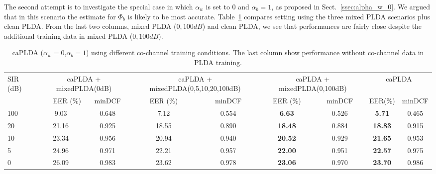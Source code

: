 The second attempt is to investigate the special case in which $\alpha_w$ is set to $0$ and $\alpha_b=1$, as proposed in Sect.~\ref{ssec:alpha_w_0}. 
We argued that in this scenario the estimate for $\Phi_b$ is likely to be most accurate. 
Table~\ref{tbl:alpha_w_0} compares setting using the three mixed PLDA scenarios plus clean PLDA. 
From the last two columns, mixed PLDA ($0, 100dB$) and clean PLDA, we see that performances are fairly close despite the additional training data in mixed PLDA ($0,100dB$). 

\begin{table}[h!]
	\small
	\centering
	\resizebox{\textwidth}{!}
	{
	\begin{tabular}{|l|c|c|c|c|c|c|c|c|c|c|c|}
		\hline
		\multirow{2}{*}{SIR (dB)} & \multicolumn{3}{c|}{caPLDA + mixedPLDA(0dB)}          & \multicolumn{3}{c|}{caPLDA + mixedPLDA(0,5,10,20,100dB)}  & \multicolumn{3}{c|}{caPLDA + mixedPLDA(0,100dB)}             & \multicolumn{2}{c|}{caPLDA} \\ \cline{2-12} 
		& \multicolumn{2}{r|}{EER (\%)} & minDCF         & \multicolumn{2}{c|}{EER (\%)} & minDCF             & \multicolumn{2}{c|}{EER (\%)}       & minDCF          & EER(\%)               & minDCF       \\ \hline
		100                       & \multicolumn{2}{c|}{9.03}     & 0.648          & \multicolumn{2}{c|}{7.12}     & 0.554              & \multicolumn{2}{c|}{\textbf{6.63}}  & 0.526           & \textbf{5.71}         & 0.465        \\ \hline
		20                        & \multicolumn{2}{c|}{21.16}    & 0.925          & \multicolumn{2}{c|}{18.55}    & 0.890              & \multicolumn{2}{c|}{\textbf{18.48}} & 0.884           & \textbf{18.83}        & 0.915        \\ \hline
		10                        & \multicolumn{2}{c|}{23.34}    & 0.956          & \multicolumn{2}{c|}{20.94}    & 0.940              & \multicolumn{2}{c|}{\textbf{20.52}} & 0.929           & \textbf{21.65}        & 0.953        \\ \hline
		5                         & \multicolumn{2}{c|}{24.96}    & 0.971          & \multicolumn{2}{c|}{22.21}    & 0.957              & \multicolumn{2}{c|}{\textbf{22.00}} & 0.951           & \textbf{22.57}        & 0.975        \\ \hline
		0                         & \multicolumn{2}{c|}{26.09}    & 0.983          & \multicolumn{2}{c|}{23.62}    & 0.978              & \multicolumn{2}{c|}{\textbf{23.06}} & 0.970           & \textbf{23.70}        & 0.986        \\ \hline
	\end{tabular}
	}
	\caption{caPLDA ($\alpha_w=0$,$\alpha_b=1$) using different co-channel training conditions. The last column show performance without co-channel data in PLDA training.}
	\label{tbl:alpha_w_0}
\end{table}


